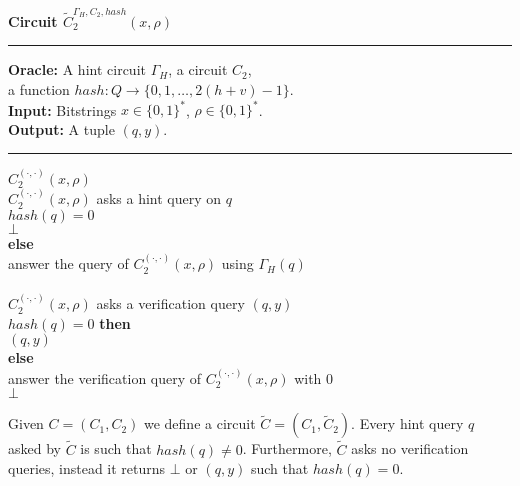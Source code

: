 %
\begin{codeblock}
  \textbf{Circuit $\widetilde{C}_2^{\Gamma_H, C_2, hash} (x, \rho)$}
  \medskip \hrule \medskip
  \textbf{Oracle:} A hint circuit $\Gamma_H$, a circuit $C_2$, \\
  \IndII a function $hash : Q \rightarrow \{0,1,\dots, 2(h+v)-1\}$. \\
  \textbf{Input:} Bitstrings $x \in \{0,1\}^{*}$, $\rho \in \{0,1\}^{*}$. \\
  \textbf{Output:} A tuple $(q, y)$.
  \medskip\hrule\medskip
  \Run $C_2^{(\cdot, \cdot)}(x, \rho)$ \\
  \IndI \If $C_2^{(\cdot, \cdot)}(x, \rho)$ asks a hint query on $q$ \Then\\
  \IndII \If $hash(q) = 0$ \Then\\
  \IndIII \Return $\bot$\\
  \IndII \textbf{else}\\
  \IndIII answer the query of $C_2^{(\cdot, \cdot)}(x, \rho)$ using $\Gamma_H(q)$\\
  \\
  \IndI \If $C_2^{(\cdot, \cdot)}(x, \rho)$ asks a verification query $(q, y)$ \Then \\
  \IndII \If $hash(q) = 0 $ \textbf{then} \\
  \IndIII \Return $(q, y)$ \\
  \IndII \textbf{else} \\
  \IndIII answer the verification query of $C_2^{(\cdot, \cdot)}(x, \rho)$ with 0 \\
  \Return $\bot$
\end{codeblock}
%
Given $C = (C_1, C_2)$ we define a circuit $\widetilde{C} = (C_1, \widetilde{C}_2)$.
Every hint query $q$ asked by $\widetilde{C}$ is such that $hash(q) \neq 0$.
Furthermore, $\widetilde{C}$ asks no verification queries, instead it returns $\bot$ or $(q,y)$ such that
$hash(q) = 0$.

